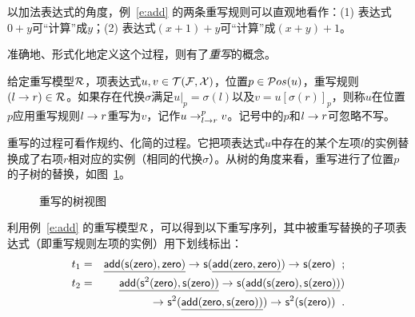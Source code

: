 以加法表达式的角度，例~\ref{e:add} 的两条重写规则可以直观地看作：(1) 表达式$0+y$可“计算”成$y$；(2) 表达式$(x+1)+y$可“计算”成$(x+y)+1$。

准确地、形式化地定义这个过程，则有了\emph{重写}的概念。

\begin{definition}[重写]
\label{d:rewriting}
给定重写模型$\cR$，项表达式$u,v\in\TFX$，位置$p\in\Pos{u}$，重写规则$(l \ra r) \in \cR$。如果存在代换$\sigma$满足$u|_p = \sigma(l)$以及$v=u[\sigma(r)]_p$，则称$u$在位置$p$应用重写规则$l\ra r$重写为$v$，记作$u\lrps{p}{l\ra r} v$。记号中的$p$和$l\ra r$可忽略不写。
\end{definition}

重写的过程可看作规约、化简的过程。它把项表达式$u$中存在的某个左项$l$的实例替换成了右项$r$相对应的实例（相同的代换$\sigma$）。从树的角度来看，重写进行了位置$p$的子树的替换，如图~\ref{f:rewriting}。

\begin{figure}[htbp]
\centering
{}
\caption{重写的树视图}
\label{f:rewriting}
\end{figure}

\begin{example}
利用例~\ref{e:add} 的重写模型$\cR$，可以得到以下重写序列，其中被重写替换的子项表达式（即重写规则左项的实例）用下划线标出：
\begin{eqnarray}
t_1 & = & \underline{\add(\s(\zero),\zero)} \lrps{}{} \s(\underline{\add(\zero,\zero)}) \lrps{}{} \s(\zero) \;\; ;\nonumber \\
t _2 & = & \underline{\add(\s^2(\zero),\s(\zero))} \lrps{}{} \s(\underline{\add(\s(\zero),\s(\zero))}) \nonumber\\ 
& & \lrps{}{} \s^2(\underline{\add(\zero,\s(\zero))}) \lrps{}{} \s^2(\s(\zero)) \;\; .\nonumber 
\end{eqnarray}
\end{example}

